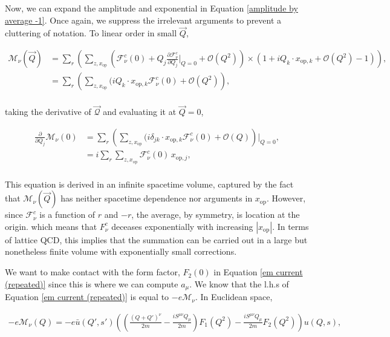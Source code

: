 \documentclass{article}
\numberwithin{equation}{section} %
\begin{document}
Now, we can expand the amplitude and exponential in Equation \ref{amplitude by average -1}. Once again, we suppress the irrelevant arguments to prevent a cluttering of notation. To linear order in small $\vec{Q}$, 

\begin{equation}
\begin{split}
\mathcal{M}_\nu(\vec{Q})&= \sum_r\left(\sum_{z,x_\mathrm{op}} (\mathcal{F}^c_\nu(0)+ Q_j\frac{\partial\mathcal{F}^c_\nu}{\partial Q_j}\bigg\vert_{Q=0}+ \mathcal{O}(Q^2))\times (1+iQ_k\cdot x_{\mathrm{op},k} + \mathcal{O}(Q^2)-1)\right),\\
&=\sum_r\left(\sum_{z,x_\mathrm{op}} (iQ_k\cdot x_{\mathrm{op},k}\mathcal{F}^c_\nu(0)+ \mathcal{O}(Q^2)\right),\\
\end{split}
\end{equation}

\noindent taking the derivative of $\mathcal{\vec{Q}}$ and evaluating it at $\vec{Q}=0$,

\begin{equation}
\begin{split}
\frac{\partial}{\partial Q_j}\mathcal{M}_\nu(0) &= \sum_r\left(\sum_{z,x_\mathrm{op}} (i\delta_{jk}\cdot x_{\mathrm{op},k}\mathcal{F}^c_\nu(0)+ \mathcal{O}(Q)\right)\bigg\vert_{Q=0},\\
&= i\sum_r\sum_{z,x_\mathrm{op}} \mathcal{F}^c_\nu(0) \, x_{\mathrm{op},j},\\
\end{split}
\label{moment hlbl}
\end{equation}

This equation is derived in an infinite spacetime volume, captured by the fact that $\mathcal{M}_\nu(\vec{Q})$ has neither spacetime dependence nor arguments in $x_\mathrm{op}$. However, since $\mathcal{F}^c_\nu$ is a function of $r$ and $-r$, the average, by symmetry, is location at the origin. which means that $F_\nu^c$ deceases exponentially with increasing $|x_\mathrm{op}|$. In terms of lattice QCD, this implies that the summation can be carried out in a large but nonetheless finite volume with exponentially small corrections.

We want to make contact with the form factor, $F_2(0)$ in Equation \ref{em current (repeated)} since this is where we can compute $a_\mu$. We know that the l.h.s of Equation \ref{em current (repeated)} is equal to $-e\mathcal{M}_\nu$. In Euclidean space,

\begin{equation}
\begin{split}
-e\mathcal{M}_\nu(Q)= -e\bar{u}(Q',s')\left( \left( \frac{(Q+Q')^\nu }{2m} - \frac{iS^{\mu\nu}Q_\mu}{2m} \right) F_1(Q^2) - \frac{iS^{\mu\nu}Q_\mu}{2m}F_2(Q^2) \right)u(Q,s),
\end{split}
\label{amplitude - emcurrent element}
\end{equation}
\end{document}
